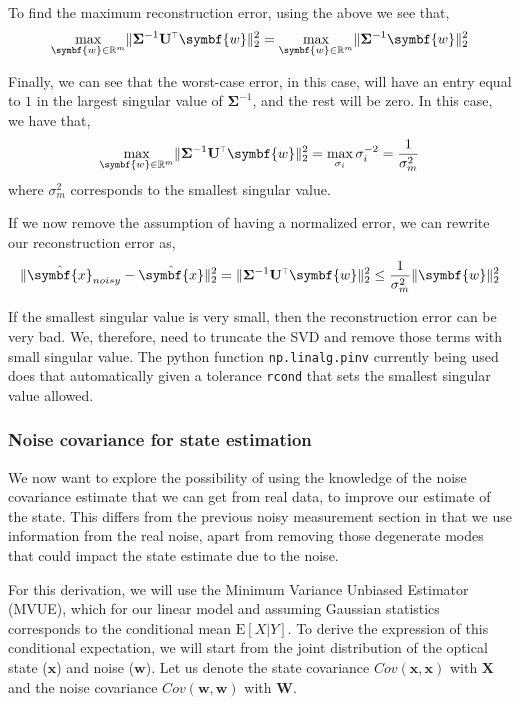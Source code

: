 \documentclass[SE,authoryear,toc]{lsstdoc}
\renewcommand{\v}[1]{\mathbf{#1}}
\newcommand{\tr}{\scalebox{0.6}{$\top$}}
\DeclarePairedDelimiter{\norm}{\lVert}{\rVert}
\begin{document}
To find the maximum reconstruction error, using the above we see that, 
\begin{equation}
    \max_{\symbf{w} \in \mathbb{R}^m} \norm{\v{\Sigma}^{-1}\v{U}^{\tr}\symbf{w} }_2^2 = \max_{\symbf{w} \in \mathbb{R}^m} \norm{\v{\Sigma}^{-1}\symbf{w} }_2^2
\end{equation}

Finally, we can see that the worst-case error, in this case, will have an entry equal to $1$ in the largest singular value of $\v{\Sigma}^{-1}$, and the rest will be zero. In this case, we have that,
\begin{equation}
    \max_{\symbf{w} \in \mathbb{R}^m} \norm{\v{\Sigma}^{-1}\v{U}^{\tr}\symbf{w} }_2^2 = \max_{\sigma_i} \sigma_i^{-2} = \frac{1}{\sigma_m^2}
\end{equation}
where $\sigma_m^2$ corresponds to the smallest singular value. 

If we now remove the assumption of having a normalized error, we can rewrite our reconstruction error as, 
\begin{equation}
    \norm{\hat{\symbf{x}}_{noisy} - \hat{\symbf{x}}}_2^2 = \norm{\v{\Sigma}^{-1}\v{U}^{\tr}\symbf{w} }_2^2 \leq  \frac{1}{\sigma_m^2} \norm{\symbf{w}}^2_2
\end{equation}

If the smallest singular value is very small, then the reconstruction error can be very bad. We, therefore, need to truncate the SVD and remove those terms with small singular value. The python function \texttt{np.linalg.pinv} currently being used does that automatically given a tolerance \texttt{rcond} that sets the smallest singular value allowed.
\subsubsection*{Noise covariance for state estimation}
We now want to explore the possibility of using the knowledge of the noise covariance estimate that we can get from real data, to improve our estimate of the state. This differs from the previous noisy measurement section in that we use information from the real noise, apart from removing those degenerate modes that could impact the state estimate due to the noise. 

For this derivation, we will use the Minimum Variance Unbiased Estimator (MVUE), which for our linear model and assuming Gaussian statistics corresponds to the conditional mean $\mathrm{E}[X | Y]$. To derive the expression of this conditional expectation, we will start from the joint distribution of the optical state ($\symbf{x}$) and noise ($\symbf{w}$). Let us denote the state covariance $Cov(\symbf{x}, \symbf{x})$ with  $\v{X}$ and the noise covariance $Cov(\symbf{w}, \symbf{w})$ with $\v{W}$.  
\end{document}
